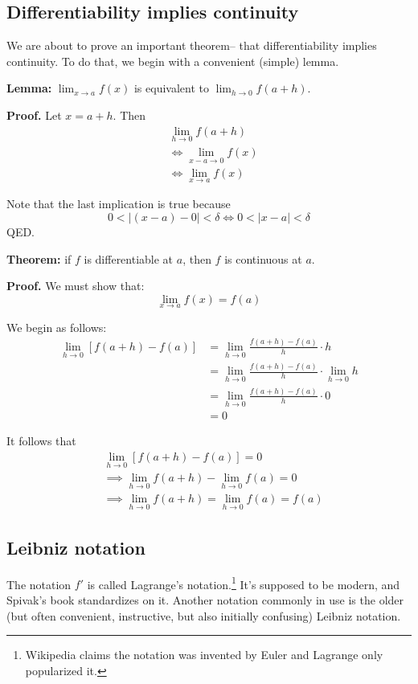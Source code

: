 \subsection{Differentiability implies continuity}\label{diff-implies-cont}

We are about to prove an important theorem-- that differentiability
implies continuity. To do that, we begin with a convenient (simple)
lemma.

\vs

\textbf{Lemma:} $\lim_{x\to a}f(x)$ is equivalent to $\lim_{h\to
  0}f(a+h)$.

\textbf{Proof.} Let $x=a+h$. Then
\begin{align*}
  &\lim_{h\to0}f(a+h)\\
  &\iff\lim_{x-a\to0}f(x)\\
  &\iff\lim_{x\to a}f(x)
\end{align*}

Note that the last implication is true because
\[0<|(x-a)-0|<\delta\iff 0<|x-a|<\delta\]
QED.

\vs

\textbf{Theorem:} if $f$ is differentiable at $a$, then $f$ is
continuous at $a$.

\textbf{Proof.} We must show that:
\[\lim_{x\to a}f(x)=f(a)\]

We begin as follows:
\begin{align*}
  \lim_{h\to0}[f(a+h)-f(a)]&=\lim_{h\to0}\frac{f(a+h)-f(a)}{h}\cdot h\\
                         &=\lim_{h\to0}\frac{f(a+h)-f(a)}{h}\cdot \lim_{h\to
                           0}h\\
                         &=\lim_{h\to0}\frac{f(a+h)-f(a)}{h}\cdot 0\\
                         &=0
\end{align*}

It follows that
\begin{align*}
  &\lim_{h\to0}[f(a+h)-f(a)]=0\\
  &\implies \lim_{h\to0}f(a+h)-\lim_{h\to0}f(a)=0\\
  &\implies \lim_{h\to0}f(a+h)=\lim_{h\to0}f(a)=f(a)
\end{align*}

\subsection{Leibniz notation}

The notation $f'$ is called Lagrange's notation.\footnote{Wikipedia
  claims the notation was invented by Euler and Lagrange only
  popularized it.} It's supposed to be modern, and Spivak's book
standardizes on it. Another notation commonly in use is the older (but
often convenient, instructive, but also initially confusing) Leibniz
notation.

